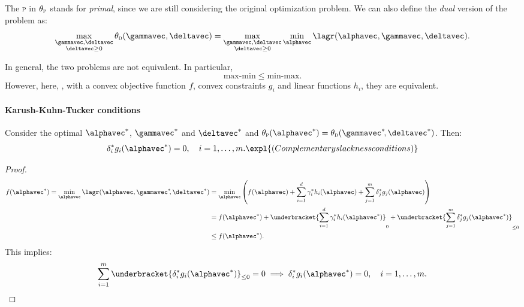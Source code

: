 The \textsc{p} in $\theta_{\textsc{p}}$ stands for \emph{primal}, since we are still considering the original optimization problem. We can also define the \emph{dual} version of the problem as:
\begin{equation}
    \max_{\substack{\gammavec, \deltavec\\\deltavec \geq 0}} \theta_{\textsc{d}}(\gammavec, \deltavec) = \max_{\substack{\gammavec, \deltavec\\\deltavec \geq 0}} \min_{\alphavec} \lagr(\alphavec, \gammavec, \deltavec).
\end{equation}

\begin{note}
    In general, the two problems are not equivalent. In particular,
    \begin{equation}
        \text{max-min} \leq \text{min-max}.
    \end{equation}
    However, here, \ie, with a convex objective function $f\negthinspace$, convex constraints $g_i$ and linear functions $h_i$, they are equivalent.
\end{note}

\paragraph{Karush-Kuhn-Tucker conditions} Consider the optimal $\alphavec^*$\negthinspace, $\gammavec^*$ and $\deltavec^*$ and $\theta_{\textsc{p}}(\alphavec^*) = \theta_{\textsc{d}}(\gammavec^*\negthinspace, \deltavec^*)$. Then:
\begin{equation}
    \delta_i^*g_i(\alphavec^*) = 0, \quad i = 1, \dots, m. \expl{(Complementary slackness conditions)}
\end{equation}

\begin{proof}
    \begin{equation}
        \begin{aligned}
            f(\alphavec^*) = \min_{\alphavec} \lagr(\alphavec, \gammavec^*\negmedspace, \deltavec^*) & = \min_{\alphavec} \left(f(\alphavec) + \sum_{i=1}^d \gamma_i^* h_i(\alphavec) + \sum_{j=1}^m \delta_j^* g_j(\alphavec)\right)                         \\
                                                                                                    & = f(\alphavec^*) + \underbracket{\sum_{i=1}^d \gamma_i^* h_i(\alphavec^*)}_{0} + \underbracket{\sum_{j=1}^m \delta_j^* g_j(\alphavec^*)}_{\leq 0} \\
                                                                                                    & \leq f(\alphavec^*).
        \end{aligned}
    \end{equation}
    This implies:
    \begin{equation}
        \sum_{i = 1}^m \underbracket{\delta_i^* g_i(\alphavec^*)}_{\leq 0} = 0 \implies \delta_i^* g_i(\alphavec^*) = 0, \quad i = 1, \dots, m.\qedhere
    \end{equation}
\end{proof}

